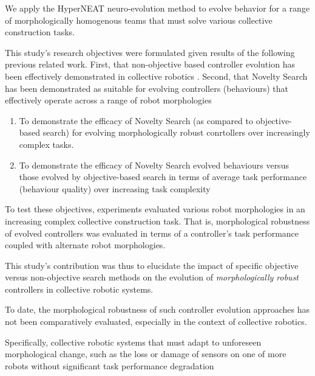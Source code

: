 {We apply the HyperNEAT \cite{StanleyDAmbrosioGauci2009} neuro-evolution method to evolve
behavior for a range of morphologically homogenous teams that must solve various collective construction tasks.

This study's research objectives were formulated given results of the following previous related work. First, that non-objective based controller evolution has been effectively demonstrated in collective robotics \cite{RefWorks:11, gomes2013generic, RefWorks:5}.
Second, that Novelty Search has been demonstrated as suitable for evolving controllers (behaviours) that effectively operate across a range of robot morphologies






\begin{enumerate}
	\item To demonstrate the efficacy of Novelty Search (as compared to objective-based search) for evolving morphologically robust conrtollers over increasingly complex tasks.
	\item To demonstrate the efficacy of Novelty Search evolved behaviours versus those evolved by objective-based search in terms of average task performance (behaviour quality) over increasing task complexity
\end{enumerate}

To test these objectives, experiments evaluated various robot morphologies in an increasing complex collective construction task. 
That is, morphological robustness of evolved controllers was evaluated in terms of a controller's task performance coupled with alternate robot morphologies.

This study's contribution was thus to elucidate the impact of specific objective versus non-objective search methods on the evolution of \textit{morphologically robust} controllers in collective robotic systems. 

To date, the morphological robustness of such controller evolution approaches has not been comparatively evaluated, especially in the context of collective robotics. 

Specifically, collective robotic systems that must adapt to unforeseen morphological change, such as the loss or damage of sensors on one of more robots without significant task performance degradation \cite{BongardZykovLipson2006} \cite{CullyCluneTaraporeMouret2015}


}
